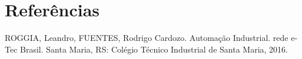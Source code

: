 \documentclass{article}
\begin{document}
\section{Referências}

ROGGIA, Leandro, FUENTES, Rodrigo Cardozo. Automação Industrial. rede e-Tec Brasil. Santa Maria, RS: Colégio Técnico Industrial de Santa Maria, 2016. 
\end{document}
